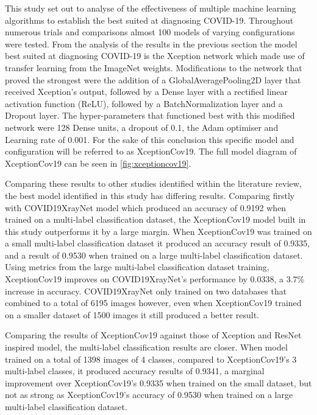 This study set out to analyse of the effectiveness of multiple machine learning algorithms to establish the best suited at diagnosing COVID-19. Throughout numerous trials and comparisons almost 100 models of varying configurations were tested. From the analysis of the results in the previous section the model best suited at diagnosing COVID-19 is the Xception network which made use of transfer learning from the ImageNet weights. Modifications to the network that proved the strongest were the addition of a GlobalAveragePooling2D layer that received Xception’s output, followed by a Dense layer with a rectified linear activation function (ReLU), followed by a BatchNormalization layer and a Dropout layer. The hyper-parameters that functioned best with this modified network were 128 Dense units, a dropout of 0.1, the Adam optimiser and Learning rate of 0.001. For the sake of this conclusion this specific model and configuration will be referred to as XceptionCov19. The full model diagram of XceptionCov19 can be seen in \autoref{fig:xceptioncov19}.

Comparing these results to other studies identified within the literature review, the best model identified in this study has differing results. Comparing firstly with \cite{zhang2020covid19xraynet} COVID19XrayNet model which produced an accuracy of 0.9192 when trained on a multi-label classification dataset, the XceptionCov19 model built in this study outperforms it by a large margin. When XceptionCov19 was trained on a small multi-label classification dataset it produced an accuracy result of 0.9335, and a result of 0.9530 when trained on a large multi-label classification dataset. Using metrics from the large multi-label classification dataset training, XceptionCov19 improves on COVID19XrayNet's performance by 0.0338, a 3.7\% increase in accuracy. COVID19XrayNet only trained on two databases that combined to a total of 6195 images however, even when XceptionCov19 trained on a smaller dataset of 1500 images it still produced a better result.

Comparing the results of XceptionCov19 against those of \cite{fitriasari2021improvement} Xception and ResNet inspired model, the multi-label classification results are closer. When \cite{fitriasari2021improvement} model trained on a total of 1398 images of 4 classes, compared to XceptionCov19's 3 multi-label classes, it produced accuracy results of 0.9341, a marginal improvement over XceptionCov19's 0.9335 when trained on the small dataset, but not as strong as XceptionCov19's accuracy of 0.9530 when trained on a large multi-label classification dataset.

